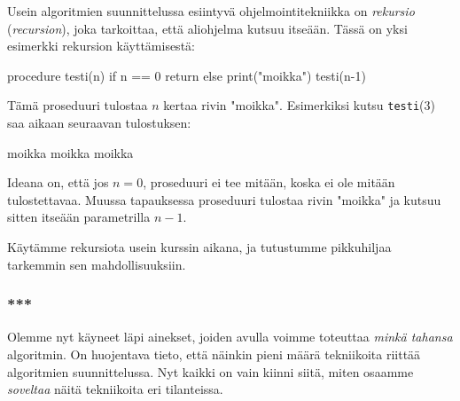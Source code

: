 Usein algoritmien suunnittelussa esiintyvä ohjelmointitekniikka on
\emph{rekursio} (\emph{recursion}),
joka tarkoittaa, että aliohjelma kutsuu itseään.
Tässä on yksi esimerkki rekursion käyttämisestä:

\begin{code}
procedure testi(n)
    if n == 0
        return
    else
        print("moikka")
        testi(n-1)
\end{code}

Tämä proseduuri tulostaa $n$ kertaa rivin "moikka".
Esimerkiksi kutsu \texttt{testi}(3) saa aikaan seuraavan tulostuksen:

\begin{code}
moikka
moikka
moikka
\end{code}

Ideana on, että jos $n=0$, proseduuri ei tee mitään,
koska ei ole mitään tulostettavaa.
Muussa tapauksessa proseduuri tulostaa rivin "moikka"
ja kutsuu sitten itseään parametrilla $n-1$.

Käytämme rekursiota usein kurssin aikana,
ja tutustumme pikkuhiljaa tarkemmin sen mahdollisuuksiin.

\subsubsection{***}

Olemme nyt käyneet läpi ainekset,
joiden avulla voimme toteuttaa \emph{minkä tahansa} algoritmin.
On huojentava tieto, että näinkin pieni määrä tekniikoita
riittää algoritmien suunnittelussa.
Nyt kaikki on vain kiinni siitä, miten osaamme \emph{soveltaa}
näitä tekniikoita eri tilanteissa.
